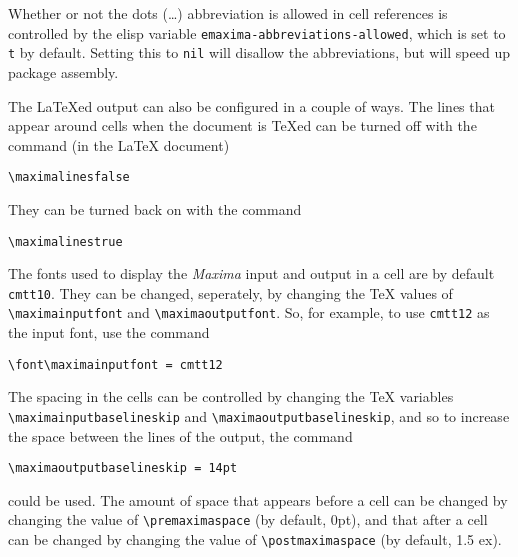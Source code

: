 \documentclass{article}
\newcommand{\mx}{\textsl{\sffamily Maxima}}
\begin{document}
Whether or not the dots (\dots{}) abbreviation is allowed in cell
references is controlled by the elisp variable
\texttt{emaxima-abbreviations-allowed}, which is set to \texttt{t} by
default.  Setting this to \texttt{nil} will disallow the abbreviations,
but will speed up package assembly.

The \LaTeX{}ed output can also be configured in a couple of ways.
The lines that appear around cells when the document is \TeX{}ed can be
turned off with the command (in the \LaTeX{} document)
\begin{verbatim}
\maximalinesfalse
\end{verbatim}
\noindent
They can be turned back on with the command
\begin{verbatim}
\maximalinestrue
\end{verbatim}
\noindent

The fonts used to display the \mx{} input and output in a cell are by
default \texttt{cmtt10}.  They can be changed, seperately, by changing the
\TeX{} values of \verb+\maximainputfont+ and \verb+\maximaoutputfont+.
So, for example, to use \texttt{cmtt12} as the input font, use the command
\begin{verbatim}
\font\maximainputfont = cmtt12
\end{verbatim}
\noindent
The spacing in the cells can be controlled by changing the \TeX{}
variables \verb+\maximainputbaselineskip+ and
\verb+\maximaoutputbaselineskip+, and so to increase the space between
the lines of the output, the command
\begin{verbatim}
\maximaoutputbaselineskip = 14pt
\end{verbatim}
\noindent
could be used.
The amount of space that appears before a cell can be changed by changing
the value of \verb+\premaximaspace+ (by default, 0pt), and that after
a cell can be changed by changing the value of \verb+\postmaximaspace+
(by default, 1.5 ex).
 
\end{document}
